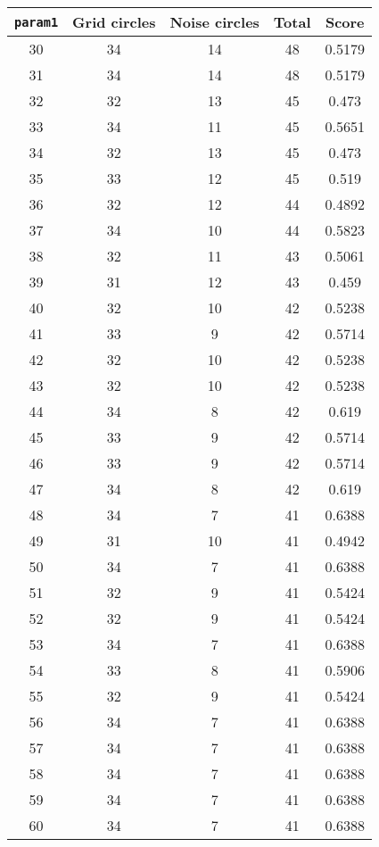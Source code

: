\documentclass[letterpaper, 12pt]{article}
\begin{document}
\begin{longtable}{|c|c|c|c|c|}
\hline
\textbf{\texttt{param1}} & \textbf{Grid circles} & \textbf{Noise circles} & \textbf{Total} & \textbf{Score} \\
\hline
30 & 34 & 14 & 48 & 0.5179 \\
\hline
31 & 34 & 14 & 48 & 0.5179 \\
\hline
32 & 32 & 13 & 45 & 0.473 \\
\hline
33 & 34 & 11 & 45 & 0.5651 \\
\hline
34 & 32 & 13 & 45 & 0.473 \\
\hline
35 & 33 & 12 & 45 & 0.519 \\
\hline
36 & 32 & 12 & 44 & 0.4892 \\
\hline
37 & 34 & 10 & 44 & 0.5823 \\
\hline
38 & 32 & 11 & 43 & 0.5061 \\
\hline
39 & 31 & 12 & 43 & 0.459 \\
\hline
40 & 32 & 10 & 42 & 0.5238 \\
\hline
41 & 33 & 9 & 42 & 0.5714 \\
\hline
42 & 32 & 10 & 42 & 0.5238 \\
\hline
43 & 32 & 10 & 42 & 0.5238 \\
\hline
44 & 34 & 8 & 42 & 0.619 \\
\hline
45 & 33 & 9 & 42 & 0.5714 \\
\hline
46 & 33 & 9 & 42 & 0.5714 \\
\hline
47 & 34 & 8 & 42 & 0.619 \\
\hline
48 & 34 & 7 & 41 & 0.6388 \\
\hline
49 & 31 & 10 & 41 & 0.4942 \\
\hline
50 & 34 & 7 & 41 & 0.6388 \\
\hline
51 & 32 & 9 & 41 & 0.5424 \\
\hline
52 & 32 & 9 & 41 & 0.5424 \\
\hline
53 & 34 & 7 & 41 & 0.6388 \\
\hline
54 & 33 & 8 & 41 & 0.5906 \\
\hline
55 & 32 & 9 & 41 & 0.5424 \\
\hline
56 & 34 & 7 & 41 & 0.6388 \\
\hline
57 & 34 & 7 & 41 & 0.6388 \\
\hline
58 & 34 & 7 & 41 & 0.6388 \\
\hline
59 & 34 & 7 & 41 & 0.6388 \\
\hline
60 & 34 & 7 & 41 & 0.6388 \\
\hline

\end{longtable}
\end{document}
